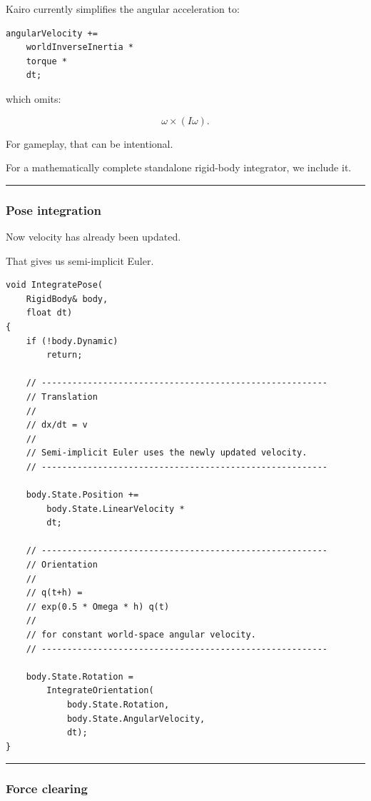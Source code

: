 Kairo currently simplifies the angular acceleration to:

\begin{verbatim}
angularVelocity +=
    worldInverseInertia *
    torque *
    dt;
\end{verbatim}

which omits:

\[
\omega\times(I\omega).
\]

For gameplay, that can be intentional.

For a mathematically complete standalone rigid-body integrator, we include it.

\begin{center}\rule{0.5\linewidth}{0.5pt}\end{center}

\subsubsection{Pose integration}\label{pose-integration}

Now velocity has already been updated.

That gives us semi-implicit Euler.

\begin{verbatim}
void IntegratePose(
    RigidBody& body,
    float dt)
{
    if (!body.Dynamic)
        return;

    // --------------------------------------------------------
    // Translation
    //
    // dx/dt = v
    //
    // Semi-implicit Euler uses the newly updated velocity.
    // --------------------------------------------------------

    body.State.Position +=
        body.State.LinearVelocity *
        dt;

    // --------------------------------------------------------
    // Orientation
    //
    // q(t+h) =
    // exp(0.5 * Omega * h) q(t)
    //
    // for constant world-space angular velocity.
    // --------------------------------------------------------

    body.State.Rotation =
        IntegrateOrientation(
            body.State.Rotation,
            body.State.AngularVelocity,
            dt);
}
\end{verbatim}

\begin{center}\rule{0.5\linewidth}{0.5pt}\end{center}

\subsubsection{Force clearing}\label{force-clearing}

